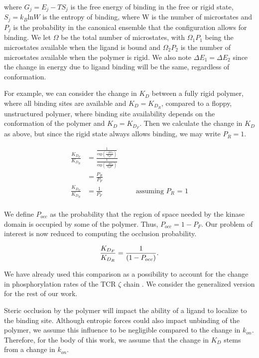 \documentclass[../AdvancementSummary.tex]{subfiles}
\begin{document}
where $G_j=E_j-TS_j$ is the free energy of binding in the free or rigid state, $S_j = k_B \mbox{ln} W$ is the entropy of binding, where W is the number of microstates and $P_j$ is the probability in the canonical ensemble that the configuration allows for binding. We let $\Omega$ be the total number of microstates, with $\Omega_1 P_1$ being the microstates available when the ligand is bound and $\Omega_2 P_2$ is the number of microstates available when the polymer is rigid. We also note $\Delta E_1 = \Delta E_2$ since the change in energy due to ligand binding will be the same, regardless of conformation.

For example, we can consider the change in $K_D$ between a fully rigid polymer, where all binding sites are available and $K_D = K_{D_R}$, compared to a floppy, unstructured polymer, where binding site availability depends on the conformation of the polymer and $K_D = K_{D_F}$. Then we calculate the change in $K_D$ as above, but since the rigid state always allows binding, we may write $P_R =1$. 

\begin{align} 
\frac{K_{D_F}}{K_{D_R}}  &= \frac{\frac{1}{\mbox{exp} \left( \frac{-\Delta G_F}{k_B T}\right) }}{\frac{1}{\mbox{exp} \left( \frac{-\Delta G_R}{k_B T}\right)}} \\ 
&= \frac{P_R}{P_F}\\
\frac{K_{D_F}}{K_{D_R}} &=\frac{1}{P_F} \hspace{2cm} \text{assuming $P_R$ = 1} \\
\end{align}  

We define $P_{occ}$ as the probability that the region of space needed by the kinase domain is occupied by some of the polymer. Thus, $P_{occ}=1-P_F$. Our problem of interest is now reduced to computing the occlusion probability. 

\begin{equation}
\frac{K_{D_F}}{K_{D_R}} = \frac{1}{(1-P_{occ})}. \\
\end{equation}

We have already used this comparison as a possibility to account for the change in phosphorylation rates of the TCR $\zeta$ chain \cite{Mukhopadhyay2016}. We consider the generalized version for the rest of our work. 

Steric occlusion by the polymer will impact the ability of a ligand to localize to the binding site. Although entropic forces could also impact unbinding of the polymer, we assume this influence to be negligible compared to the change in $k_{on}$. Therefore, for the body of this work, we assume that the change in $K_D$ stems from a change in $k_{on}$.
\end{document}
